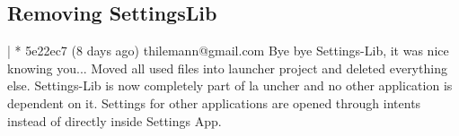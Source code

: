 \subsection{Removing SettingsLib}
| * 5e22ec7 (8 days ago) thilemann@gmail.com Bye bye Settings-Lib, it was nice knowing you... Moved all used files into launcher project and deleted everything else. Settings-Lib is now completely part of la
uncher and no other application is dependent on it. Settings for other applications are opened through intents instead of directly inside Settings App.